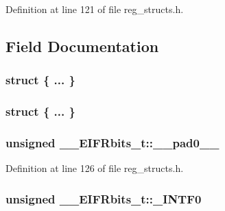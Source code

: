 Definition at line 121 of file reg\+\_\+structs.\+h.



\subsection{Field Documentation}
\hypertarget{union_____e_i_f_rbits__t_a1c7d3196a9914b4efa561772a412ac0f}{\subsubsection[{"@25}]{\setlength{\rightskip}{0pt plus 5cm}struct \{ ... \} }}\label{union_____e_i_f_rbits__t_a1c7d3196a9914b4efa561772a412ac0f}
\hypertarget{union_____e_i_f_rbits__t_ac4478e755e45c7899246dba7aa7c9cba}{\subsubsection[{"@27}]{\setlength{\rightskip}{0pt plus 5cm}struct \{ ... \} }}\label{union_____e_i_f_rbits__t_ac4478e755e45c7899246dba7aa7c9cba}
\hypertarget{union_____e_i_f_rbits__t_a53f49a1c827625f5ebefe9eba29e6289}{
\subsubsection[{\+\_\+\+\_\+pad0\+\_\+\+\_\+}]{\setlength{\rightskip}{0pt plus 5cm}unsigned \+\_\+\+\_\+\+E\+I\+F\+Rbits\+\_\+t\+::\+\_\+\+\_\+pad0\+\_\+\+\_\+}}\label{union_____e_i_f_rbits__t_a53f49a1c827625f5ebefe9eba29e6289}


Definition at line 126 of file reg\+\_\+structs.\+h.

\hypertarget{union_____e_i_f_rbits__t_a911c8e8e206c1eb8b9bc62e55c6a8775}{
\subsubsection[{\+\_\+\+I\+N\+T\+F0}]{\setlength{\rightskip}{0pt plus 5cm}unsigned \+\_\+\+\_\+\+E\+I\+F\+Rbits\+\_\+t\+::\+\_\+\+I\+N\+T\+F0}}\label{union_____e_i_f_rbits__t_a911c8e8e206c1eb8b9bc62e55c6a8775}


